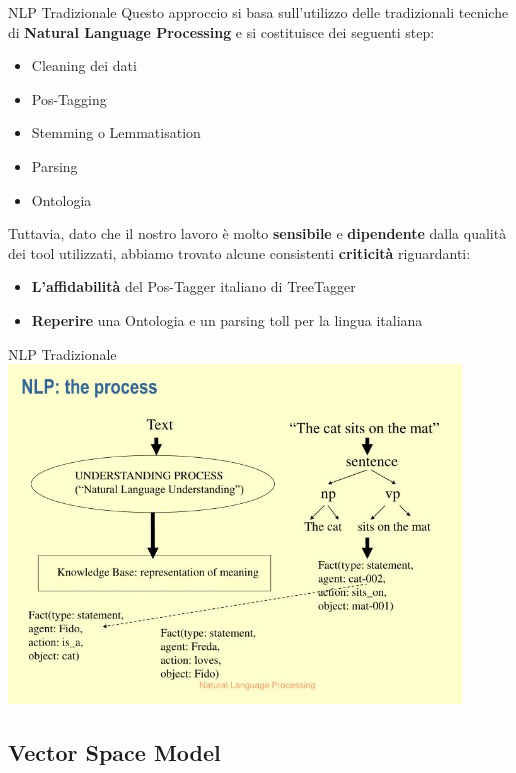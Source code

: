 \documentclass[british]{beamer}
\begin{document}
\begin{frame}{NLP Tradizionale}
	Questo approccio si basa sull'utilizzo delle tradizionali tecniche di \textbf{Natural Language Processing} e si costituisce dei seguenti step:
	\begin{itemize}
		\item Cleaning dei dati
		\item Pos-Tagging
		\item Stemming o Lemmatisation
		\item Parsing
		\item Ontologia
	\end{itemize}
	Tuttavia, dato che il nostro lavoro \`{e} molto \textbf{sensibile} e \textbf{dipendente} dalla qualit\`{a} dei tool utilizzati, abbiamo trovato alcune consistenti \textbf{criticit\`{a}} riguardanti:
	\begin{itemize}
		\item \textbf{L'affidabilit\`{a}} del Pos-Tagger italiano di TreeTagger
		\item \textbf{Reperire} una Ontologia e un parsing toll per la  lingua italiana
	\end{itemize}
\end{frame}

\begin{frame}{NLP Tradizionale}
	\includegraphics[width=0.9\textwidth, height=0.85\textheight]{./Imgs/nlp-the-process.jpg}
\end{frame}
	
\subsection{Vector Space Model}
	
\end{document}
